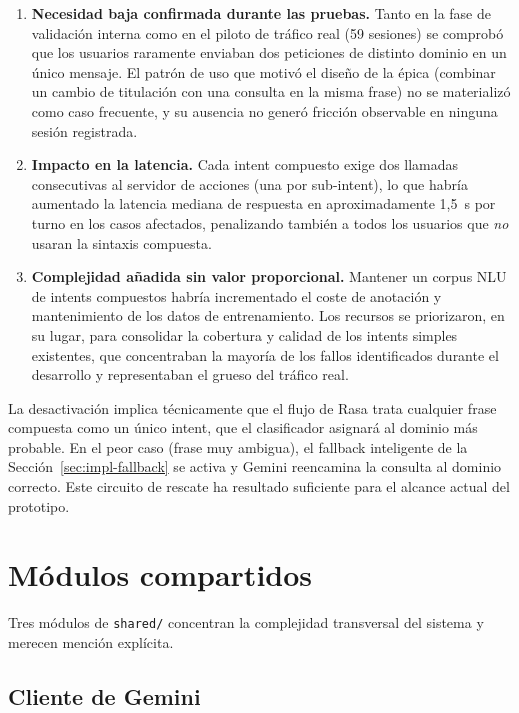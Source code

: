 \begin{enumerate}
    \item \textbf{Necesidad baja confirmada durante las pruebas.} Tanto en la fase de validación interna como en el piloto de tráfico real (59 sesiones) se comprobó que los usuarios raramente enviaban dos peticiones de distinto dominio en un único mensaje. El patrón de uso que motivó el diseño de la épica (combinar un cambio de titulación con una consulta en la misma frase) no se materializó como caso frecuente, y su ausencia no generó fricción observable en ninguna sesión registrada.
    \item \textbf{Impacto en la latencia.} Cada intent compuesto exige dos llamadas consecutivas al servidor de acciones (una por sub-intent), lo que habría aumentado la latencia mediana de respuesta en aproximadamente 1,5~s por turno en los casos afectados, penalizando también a todos los usuarios que \textit{no} usaran la sintaxis compuesta.
    \item \textbf{Complejidad añadida sin valor proporcional.} Mantener un corpus NLU de intents compuestos habría incrementado el coste de anotación y mantenimiento de los datos de entrenamiento. Los recursos se priorizaron, en su lugar, para consolidar la cobertura y calidad de los intents simples existentes, que concentraban la mayoría de los fallos identificados durante el desarrollo y representaban el grueso del tráfico real.
\end{enumerate}

La desactivación implica técnicamente que el flujo de Rasa trata cualquier frase compuesta como un único intent, que el clasificador asignará al dominio más probable. En el peor caso (frase muy ambigua), el fallback inteligente de la Sección~\ref{sec:impl-fallback} se activa y Gemini reencamina la consulta al dominio correcto. Este circuito de rescate ha resultado suficiente para el alcance actual del prototipo.

\section{Módulos compartidos}\label{sec:impl-shared}

Tres módulos de \texttt{shared/} concentran la complejidad transversal del sistema y merecen mención explícita.

\subsection{Cliente de Gemini}

